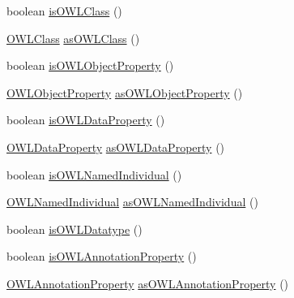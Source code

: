 \begin{DoxyCompactItemize}
\item 
boolean \hyperlink{classuk_1_1ac_1_1manchester_1_1cs_1_1owl_1_1owlapi_1_1_o_w_l2_datatype_impl_a0b64c331a7755b75b2401e4035b5ffd5}{is\-O\-W\-L\-Class} ()
\item 
\hyperlink{interfaceorg_1_1semanticweb_1_1owlapi_1_1model_1_1_o_w_l_class}{O\-W\-L\-Class} \hyperlink{classuk_1_1ac_1_1manchester_1_1cs_1_1owl_1_1owlapi_1_1_o_w_l2_datatype_impl_a5d059b00ee5bbd23a300c1c1f010e422}{as\-O\-W\-L\-Class} ()
\item 
boolean \hyperlink{classuk_1_1ac_1_1manchester_1_1cs_1_1owl_1_1owlapi_1_1_o_w_l2_datatype_impl_adc655ff112290bee3ffe93d98291fbf7}{is\-O\-W\-L\-Object\-Property} ()
\item 
\hyperlink{interfaceorg_1_1semanticweb_1_1owlapi_1_1model_1_1_o_w_l_object_property}{O\-W\-L\-Object\-Property} \hyperlink{classuk_1_1ac_1_1manchester_1_1cs_1_1owl_1_1owlapi_1_1_o_w_l2_datatype_impl_a89155c4937d2718748f0d6babb53ff1f}{as\-O\-W\-L\-Object\-Property} ()
\item 
boolean \hyperlink{classuk_1_1ac_1_1manchester_1_1cs_1_1owl_1_1owlapi_1_1_o_w_l2_datatype_impl_a58ff590949be6d410845a3dd4738b4b5}{is\-O\-W\-L\-Data\-Property} ()
\item 
\hyperlink{interfaceorg_1_1semanticweb_1_1owlapi_1_1model_1_1_o_w_l_data_property}{O\-W\-L\-Data\-Property} \hyperlink{classuk_1_1ac_1_1manchester_1_1cs_1_1owl_1_1owlapi_1_1_o_w_l2_datatype_impl_aa0adf99f05bb40ba2e9353c71be0145a}{as\-O\-W\-L\-Data\-Property} ()
\item 
boolean \hyperlink{classuk_1_1ac_1_1manchester_1_1cs_1_1owl_1_1owlapi_1_1_o_w_l2_datatype_impl_a63a7548b0db42f55406c9d258bf4980b}{is\-O\-W\-L\-Named\-Individual} ()
\item 
\hyperlink{interfaceorg_1_1semanticweb_1_1owlapi_1_1model_1_1_o_w_l_named_individual}{O\-W\-L\-Named\-Individual} \hyperlink{classuk_1_1ac_1_1manchester_1_1cs_1_1owl_1_1owlapi_1_1_o_w_l2_datatype_impl_ab0e948dc563abae5a2db76e18f079ea0}{as\-O\-W\-L\-Named\-Individual} ()
\item 
boolean \hyperlink{classuk_1_1ac_1_1manchester_1_1cs_1_1owl_1_1owlapi_1_1_o_w_l2_datatype_impl_aafa6d19aeb41a3c3d93e1b958eae4817}{is\-O\-W\-L\-Datatype} ()
\item 
boolean \hyperlink{classuk_1_1ac_1_1manchester_1_1cs_1_1owl_1_1owlapi_1_1_o_w_l2_datatype_impl_ab0d6c9f25049a755767d3789fe05a268}{is\-O\-W\-L\-Annotation\-Property} ()
\item 
\hyperlink{interfaceorg_1_1semanticweb_1_1owlapi_1_1model_1_1_o_w_l_annotation_property}{O\-W\-L\-Annotation\-Property} \hyperlink{classuk_1_1ac_1_1manchester_1_1cs_1_1owl_1_1owlapi_1_1_o_w_l2_datatype_impl_a8aa4283f774261546d96797298be4c2a}{as\-O\-W\-L\-Annotation\-Property} ()

\end{DoxyCompactItemize}
